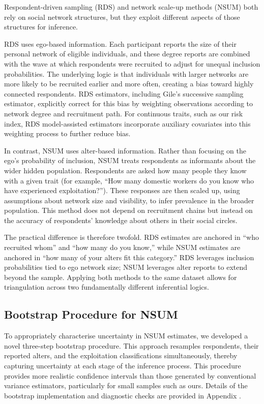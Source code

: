 \documentclass[
  12pt,
  letterpaper,
  DIV=11,
  numbers=noendperiod]{scrartcl}
\theoremstyle{plain}
\theoremstyle{definition}
\begin{document}
Respondent-driven sampling (RDS) and network scale-up methods (NSUM)
both rely on social network structures, but they exploit different
aspects of those structures for inference.

RDS uses ego-based information. Each participant reports the size of
their personal network of eligible individuals, and these degree reports
are combined with the wave at which respondents were recruited to adjust
for unequal inclusion probabilities. The underlying logic is that
individuals with larger networks are more likely to be recruited earlier
and more often, creating a bias toward highly connected respondents. RDS
estimators, including Gile's successive sampling estimator, explicitly
correct for this bias by weighting observations according to network
degree and recruitment path. For continuous traits, such as our risk
index, RDS model-assisted estimators incorporate auxiliary covariates
into this weighting process to further reduce bias.

In contrast, NSUM uses alter-based information. Rather than focusing on
the ego's probability of inclusion, NSUM treats respondents as
informants about the wider hidden population. Respondents are asked how
many people they know with a given trait (for example, ``How many
domestic workers do you know who have experienced exploitation?'').
These responses are then scaled up, using assumptions about network size
and visibility, to infer prevalence in the broader population. This
method does not depend on recruitment chains but instead on the accuracy
of respondents' knowledge about others in their social circles.

The practical difference is therefore twofold. RDS estimates are
anchored in ``who recruited whom'' and ``how many do you know,'' while
NSUM estimates are anchored in ``how many of your alters fit this
category.'' RDS leverages inclusion probabilities tied to ego network
size; NSUM leverages alter reports to extend beyond the sample. Applying
both methods to the same dataset allows for triangulation across two
fundamentally different inferential logics.

\subsection{Bootstrap Procedure for
NSUM}\label{bootstrap-procedure-for-nsum}

To appropriately characterise uncertainty in NSUM estimates, we
developed a novel three-step bootstrap procedure. This approach
resamples respondents, their reported alters, and the exploitation
classifications simultaneously, thereby capturing uncertainty at each
stage of the inference process. This procedure provides more realistic
confidence intervals than those generated by conventional variance
estimators, particularly for small samples such as ours. Details of the
bootstrap implementation and diagnostic checks are provided in Appendix
\textcite{app-3step}.
\end{document}
